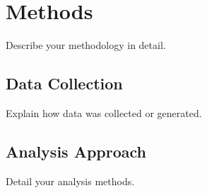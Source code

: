 \section{Methods}
\label{sec:methods}

Describe your methodology in detail.

\subsection{Data Collection}
Explain how data was collected or generated.

\subsection{Analysis Approach}
Detail your analysis methods.